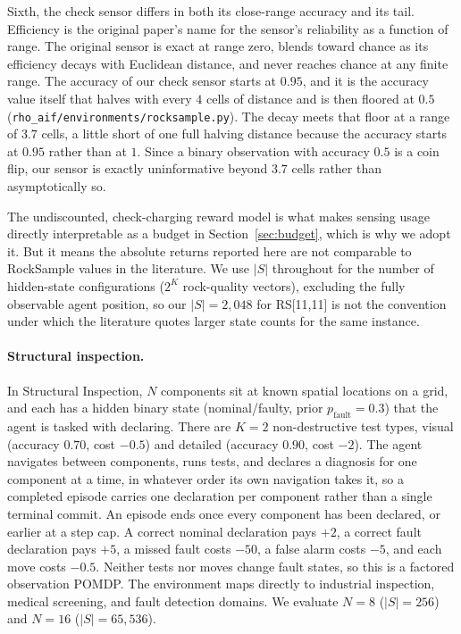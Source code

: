 Sixth, the check sensor differs in both its close-range accuracy and its tail. Efficiency is the original paper's name for the sensor's reliability as a function of range. The original sensor is exact at range zero, blends toward chance as its efficiency decays with Euclidean distance, and never reaches chance at any finite range. The accuracy of our check sensor starts at $0.95$, and it is the accuracy value itself that halves with every $4$ cells of distance and is then floored at $0.5$ (\texttt{rho\_\allowbreak aif/\allowbreak environments/\allowbreak rocksample.py}). The decay meets that floor at a range of $3.7$ cells, a little short of one full halving distance because the accuracy starts at $0.95$ rather than at $1$. Since a binary observation with accuracy $0.5$ is a coin flip, our sensor is exactly uninformative beyond $3.7$ cells rather than asymptotically so.

The undiscounted, check-charging reward model is what makes sensing usage directly interpretable as a budget in Section~\ref{sec:budget}, which is why we adopt it. But it means the absolute returns reported here are not comparable to RockSample values in the literature. We use $|S|$ throughout for the number of hidden-state configurations ($2^K$ rock-quality vectors), excluding the fully observable agent position, so our $|S|{=}2{,}048$ for RS[11,11] is not the convention under which the literature quotes larger state counts for the same instance.

\paragraph{Structural inspection.} In Structural Inspection, $N$ components sit at known spatial locations on a grid, and each has a hidden binary state (nominal/faulty, prior $p_{\text{fault}}{=}0.3$) that the agent is tasked with declaring. There are $K{=}2$ non-destructive test types, visual (accuracy $0.70$, cost $-0.5$) and detailed (accuracy $0.90$, cost $-2$). The agent navigates between components, runs tests, and declares a diagnosis for one component at a time, in whatever order its own navigation takes it, so a completed episode carries one declaration per component rather than a single terminal commit. An episode ends once every component has been declared, or earlier at a step cap. A correct nominal declaration pays $+2$, a correct fault declaration pays $+5$, a missed fault costs $-50$, a false alarm costs $-5$, and each move costs $-0.5$. Neither tests nor moves change fault states, so this is a factored observation POMDP. The environment maps directly to industrial inspection, medical screening, and fault detection domains. We evaluate $N{=}8$ ($|S|{=}256$) and $N{=}16$ ($|S|{=}65{,}536$).

